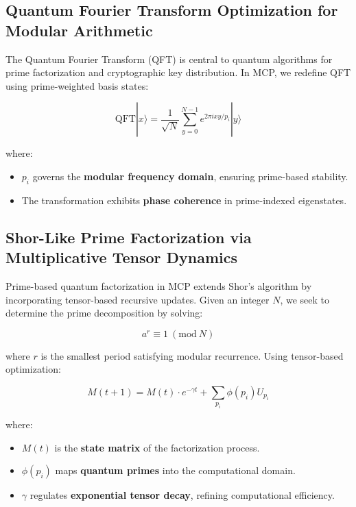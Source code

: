 \documentclass{article}
\theoremstyle{plain}
\theoremstyle{plain}
\theoremstyle{definition}
\theoremstyle{remark}
\begin{document}
\subsection{Quantum Fourier Transform Optimization for Modular Arithmetic}

The Quantum Fourier Transform (QFT) is central to quantum algorithms for prime factorization and cryptographic key distribution. In MCP, we redefine QFT using prime-weighted basis states:

\begin{equation}
\text{QFT} |x\rangle = \frac{1}{\sqrt{N}} \sum_{y=0}^{N-1} e^{2\pi i x y / p_i} |y\rangle
\end{equation}

where:
\begin{itemize}
    \item $p_i$ governs the \textbf{modular frequency domain}, ensuring prime-based stability.
    \item The transformation exhibits \textbf{phase coherence} in prime-indexed eigenstates.
\end{itemize}

\subsection{Shor-Like Prime Factorization via Multiplicative Tensor Dynamics}

Prime-based quantum factorization in MCP extends Shor’s algorithm by incorporating tensor-based recursive updates. Given an integer $N$, we seek to determine the prime decomposition by solving:

\begin{equation}
a^r \equiv 1 \ (\text{mod}\ N)
\end{equation}

where $r$ is the smallest period satisfying modular recurrence. Using tensor-based optimization:

\begin{equation}
M(t+1) = M(t) \cdot e^{- \gamma t} + \sum_{p_i} \phi(p_i) U_{p_i}
\end{equation}

where:
\begin{itemize}
    \item $M(t)$ is the \textbf{state matrix} of the factorization process.
    \item $\phi(p_i)$ maps \textbf{quantum primes} into the computational domain.
    \item $\gamma$ regulates \textbf{exponential tensor decay}, refining computational efficiency.
\end{itemize}
\end{document}
